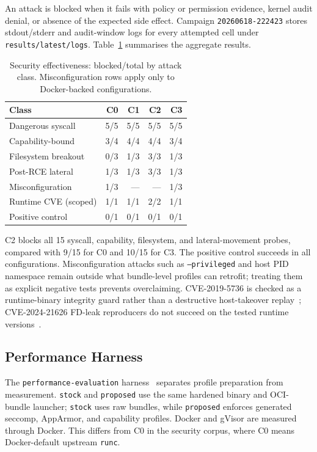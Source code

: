 \documentclass[runningheads]{llncs}
\begin{document}
An attack is blocked when it fails with policy or permission evidence, kernel audit denial, or absence of the expected side effect. Campaign \texttt{20260618-222423} stores stdout/stderr and audit-window logs for every attempted cell under \texttt{results/latest/logs}. Table~\ref{tab:security-effectiveness} summarises the aggregate results.

\begin{table}
\caption{Security effectiveness: blocked/total by attack class. Misconfiguration rows apply only to Docker-backed configurations.}
\label{tab:security-effectiveness}
\centering
\begin{tabular}{p{3.2cm}rrrr}
\toprule
\textbf{Class} & \textbf{C0} & \textbf{C1} & \textbf{C2} & \textbf{C3} \\
\midrule
Dangerous syscall & 5/5 & 5/5 & 5/5 & 5/5 \\
Capability-bound & 3/4 & 4/4 & 4/4 & 3/4 \\
Filesystem breakout & 0/3 & 1/3 & 3/3 & 1/3 \\
Post-RCE lateral & 1/3 & 1/3 & 3/3 & 1/3 \\
Misconfiguration & 1/3 & --- & --- & 1/3 \\
Runtime CVE (scoped) & 1/1 & 1/1 & 2/2 & 1/1 \\
Positive control & 0/1 & 0/1 & 0/1 & 0/1 \\
\bottomrule
\end{tabular}
\end{table}

C2 blocks all 15 syscall, capability, filesystem, and lateral-movement probes, compared with 9/15 for C0 and 10/15 for C3. The positive control succeeds in all configurations. Misconfiguration attacks such as \texttt{--privileged} and host PID namespace remain outside what bundle-level profiles can retrofit; treating them as explicit negative tests prevents overclaiming. CVE-2019-5736 is checked as a runtime-binary integrity guard rather than a destructive host-takeover replay~\cite{cve2019}; CVE-2024-21626 FD-leak reproducers do not succeed on the tested runtime versions~\cite{cve202421626}.

\subsection{Performance Harness}\label{sec:eval-performance}

The \texttt{performance-evaluation} harness~\cite{perfeval} separates profile preparation from measurement. \texttt{stock} and \texttt{proposed} use the same hardened binary and OCI-bundle launcher; \texttt{stock} uses raw bundles, while \texttt{proposed} enforces generated seccomp, AppArmor, and capability profiles. Docker and gVisor are measured through Docker. This differs from C0 in the security corpus, where C0 means Docker-default upstream \texttt{runc}.
\end{document}
